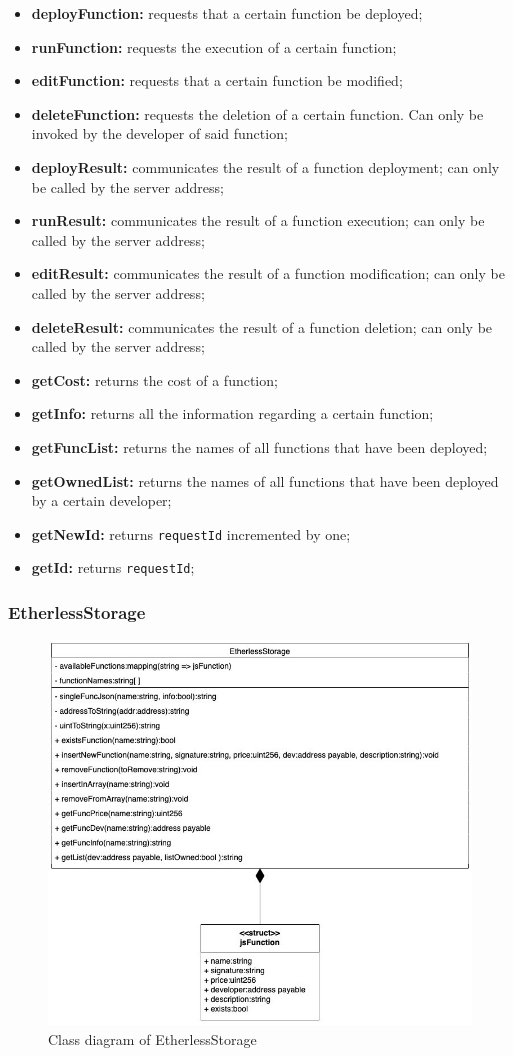	\begin{itemize}
		\item \textbf{deployFunction:} requests that a certain function be deployed;
		\item \textbf{runFunction:} requests the execution of a certain function;
		\item \textbf{editFunction:} requests that a certain function be modified;
		\item \textbf{deleteFunction:} requests the deletion of a certain function. Can only be invoked by the developer of said function;
		\item \textbf{deployResult:} communicates the result of a function deployment; can only be called by the server address;
		\item \textbf{runResult:} communicates the result of a function execution; can only be called by the server address;
		\item \textbf{editResult:} communicates the result of a function modification; can only be called by the server address;
		\item \textbf{deleteResult:} communicates the result of a function deletion; can only be called by the server address;
		\item \textbf{getCost:} returns the cost of a function;
		\item \textbf{getInfo:} returns all the information regarding a certain function;
		\item \textbf{getFuncList:} returns the names of all functions that have been deployed;
		\item \textbf{getOwnedList:} returns the names of all functions that have been deployed by a certain developer;
		\item \textbf{getNewId:} returns \texttt{requestId} incremented by one;
		\item \textbf{getId:} returns \texttt{requestId};
	\end{itemize}

\subsubsection{EtherlessStorage}
	\begin{figure}[H]
		\centering
		\includegraphics[width=0.6\linewidth]{diagrammi/etherless-smart/EtherlessStorage.jpg}
		\caption{Class diagram of EtherlessStorage}
	\end{figure}

